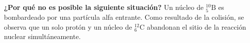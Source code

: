 \item \textbf{¿Por qué no es posible la siguiente situación?}
Un núcleo de $^{10}_{5}\text{B}$ es bombardeado por una partícula alfa entrante. Como resultado de la colisión, se observa que un solo protón y un núcleo de $^{12}_{6}\text{C}$ abandonan el sitio de la reacción nuclear simultáneamente.